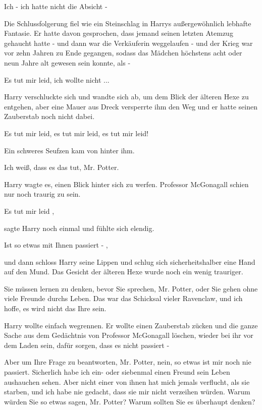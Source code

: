 \glqq Ich - ich hatte nicht die Absicht -\grqq{}

Die Schlussfolgerung fiel wie ein Steinschlag in Harrys außergewöhnlich lebhafte
Fantasie. Er hatte davon gesprochen, dass jemand seinen letzten Atemzug
gehaucht hatte - und dann war die Verkäuferin weggelaufen - und der Krieg
war vor zehn Jahren zu Ende gegangen, sodass das Mädchen höchstens acht oder
neun Jahre alt gewesen sein konnte, als -

\glqq Es tut mir leid, ich wollte nicht ...\grqq{}

Harry verschluckte sich und wandte sich ab, um dem Blick der älteren Hexe zu
entgehen, aber eine Mauer aus Dreck versperrte ihm den Weg und er hatte
seinen Zauberstab noch nicht dabei.

\glqq Es tut mir leid, es tut mir leid, es tut mir leid!\grqq{}

Ein schweres Seufzen kam von hinter ihm.

\glqq Ich weiß, dass es das tut, Mr. Potter.\grqq{}

Harry wagte es, einen Blick hinter sich zu werfen. Professor McGonagall schien
nur noch traurig zu sein.

\glqq Es tut mir leid\grqq{} ,

sagte Harry noch einmal und fühlte sich elendig.

\glqq Ist so etwas mit Ihnen passiert -\grqq{} ,

und dann schloss Harry seine Lippen und schlug sich sicherheitshalber eine Hand
auf den Mund. Das Gesicht der älteren Hexe wurde noch ein wenig trauriger.

\glqq Sie müssen lernen zu denken, bevor Sie sprechen, Mr. Potter, oder Sie
gehen ohne viele Freunde durchs Leben. Das war das Schicksal vieler
Ravenclaw, und ich hoffe, es wird nicht das Ihre sein.\grqq{}

Harry wollte einfach wegrennen. Er wollte einen Zauberstab zücken und die ganze
Sache aus dem Gedächtnis von Professor McGonagall löschen, wieder bei ihr
vor dem Laden sein, dafür sorgen, dass es nicht passiert -

\glqq Aber um Ihre Frage zu beantworten, Mr. Potter, nein, so etwas ist mir noch
nie passiert. Sicherlich habe ich ein- oder siebenmal einen Freund sein
Leben aushauchen sehen. Aber nicht einer von ihnen hat mich jemals
verflucht, als sie starben, und ich habe nie gedacht, dass sie mir nicht
verzeihen würden. Warum würden Sie so etwas sagen, Mr. Potter? Warum sollten
Sie es überhaupt denken?\grqq{}

